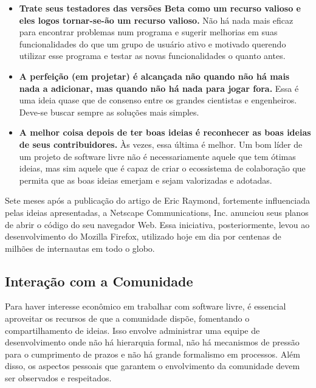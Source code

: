 \begin{itemize}
\item \textbf{Trate seus testadores das versões Beta como um recurso valioso e eles logos tornar-se-ão
  um recurso valioso.} Não há nada mais eficaz para encontrar problemas num programa e sugerir
  melhorias em suas funcionalidades do que um grupo de usuário ativo e motivado querendo utilizar
  esse programa e testar as novas funcionalidades o quanto antes.
  
\item \textbf{A perfeição (em projetar) é alcançada não quando não há mais nada a adicionar, 
  mas quando não há nada para jogar fora.} Essa é uma ideia quase que de consenso entre os grandes
  cientistas e engenheiros. Deve-se buscar sempre as soluções mais simples.

\item \textbf{A melhor coisa depois de ter boas ideias é reconhecer as boas ideias de seus contribuidores.} 
    Às vezes, essa última é melhor. Um bom líder de um projeto de software livre não é necessariamente
    aquele que tem ótimas ideias, mas sim aquele que é capaz de criar o ecossistema de 
    colaboração que permita que as boas ideias emerjam e sejam valorizadas e adotadas.

\end{itemize}

Sete meses após a publicação do artigo de Eric Raymond, fortemente influenciada
pelas ideias apresentadas, a Netscape Communications, Inc. anunciou seus planos de
abrir o código do seu navegador Web. 
%
Essa iniciativa, posteriormente, levou ao desenvolvimento do Mozilla Firefox,
utilizado hoje em dia por centenas de milhões de internautas em todo o globo.


\subsection{Interação com a Comunidade}

Para haver interesse econômico em trabalhar com software livre, é
essencial aproveitar os recursos de que a comunidade dispõe, fomentando
o compartilhamento de ideias.
%
Isso envolve administrar uma equipe de desenvolvimento onde não há
hierarquia formal, não há mecanismos de pressão para o cumprimento de
prazos e não há grande formalismo em processos.
%
Além disso, os aspectos pessoais que garantem o envolvimento da
comunidade devem ser observados e respeitados.



